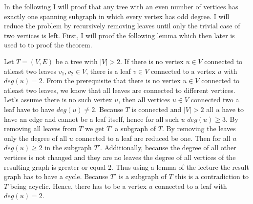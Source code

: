 \documentclass[a4paper]{article}
\begin{document}
	\begin{solution}{6}
		In the following I will proof that any tree with an even number of vertices has exactly one spanning subgraph in which every vertex has odd degree. 
		I will reduce the problem by recursively removing leaves until only the trivial case of two vertices is left. 
		First, I will proof the following lemma which then later is used to to proof the theorem. 
			
		\begin{lemma}{Let $T=(V,E)$ be a tree with $|V|>2$. If there is no vertex $u \in V$ connected to atleast two leaves $v_1, v_2 \in V$, there is a leaf $v \in V$ connected to a vertex $u$ with $deg(u) = 2$.}
			From the prerequisite that there is no vertex $u \in V$ connected to atleast two leaves, we know that all leaves are connected to different vertices. 
			Let's assume there is no such vertex $u$, then all vertices $u \in V$ connected two a leaf have to have $deg(u) \neq 2$. 
			Because $T$ is connected and $|V|>2$ all $u$ have to have an edge and cannot be a leaf itself, hence for all such $u$ $deg(u) \geq 3$. 
			By removing all leaves from $T$ we get $T'$ a subgraph of $T$. By removing the leaves only the degree of all $u$ connected to a leaf are reduced be one. 
			Then for all $u$ $deg(u) \geq 2$ in the subgraph $T'$. 
			Additionally, because the degree of all other vertices is not changed and they are no leaves the degree of all vertices of the resulting graph is greater or equal 2. 
			Thus using a lemma of the lecture the result graph has to have a cycle. 
			Because $T'$ is a subgraph of $T$ this is a contradiction to $T$ being acyclic. 
			Hence, there has to be a vertex $u$ connected to a leaf with $deg(u)=2$. 		
		\end{lemma}
					

\end{solution}
\end{document}
